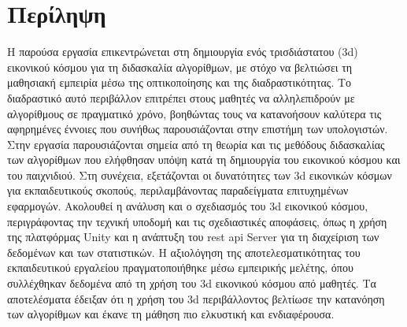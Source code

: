 \section*{Περίληψη}

Η παρούσα εργασία επικεντρώνεται στη δημιουργία ενός τρισδιάστατου (\acrshort{3d}) εικονικού κόσμου για τη διδασκαλία αλγορίθμων, με στόχο να βελτιώσει τη μαθησιακή εμπειρία μέσω της οπτικοποίησης και της διαδραστικότητας. Το διαδραστικό αυτό περιβάλλον επιτρέπει στους μαθητές να αλληλεπιδρούν με αλγορίθμους σε πραγματικό χρόνο, βοηθώντας τους να κατανοήσουν καλύτερα τις αφηρημένες έννοιες που συνήθως παρουσιάζονται στην επιστήμη των υπολογιστών. Στην εργασία παρουσιάζονται σημεία από τη  θεωρία και τις  μεθόδους  διδασκαλίας των αλγορίθμων που ελήφθησαν υπόψη κατά τη δημιουργία του εικονικού κόσμου και του παιχνιδιού. Στη συνέχεια, εξετάζονται οι δυνατότητες των \acrshort{3d} εικονικών κόσμων για εκπαιδευτικούς σκοπούς, περιλαμβάνοντας παραδείγματα επιτυχημένων εφαρμογών. Ακολουθεί η ανάλυση και ο σχεδιασμός του \acrshort{3d} εικονικού κόσμου, περιγράφοντας την τεχνική υποδομή και τις σχεδιαστικές αποφάσεις, όπως η χρήση της πλατφόρμας Unity και η ανάπτυξη του \acrshort{rest} \acrshort{api} Server για τη διαχείριση των δεδομένων και των στατιστικών. Η αξιολόγηση της αποτελεσματικότητας του εκπαιδευτικού εργαλείου πραγματοποιήθηκε μέσω εμπειρικής μελέτης, όπου συλλέχθηκαν δεδομένα από τη χρήση του \acrshort{3d} εικονικού κόσμου από μαθητές. Τα αποτελέσματα έδειξαν ότι η χρήση του \acrshort{3d} περιβάλλοντος βελτίωσε την κατανόηση των αλγορίθμων και έκανε τη μάθηση πιο ελκυστική και ενδιαφέρουσα.

\pagebreak

